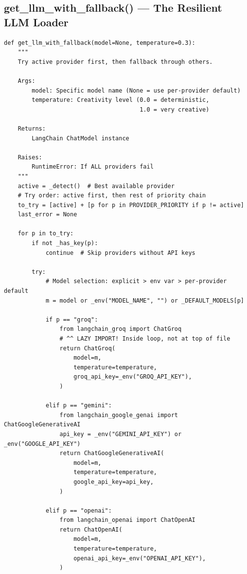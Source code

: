 \documentclass[11pt,a4paper,twoside]{report}
\begin{document}
\subsection{get\_llm\_with\_fallback() --- The Resilient LLM Loader}

\begin{lstlisting}[style=pythonstyle,caption={The most critical function in providers.py}]
def get_llm_with_fallback(model=None, temperature=0.3):
    """
    Try active provider first, then fallback through others.

    Args:
        model: Specific model name (None = use per-provider default)
        temperature: Creativity level (0.0 = deterministic,
                                       1.0 = very creative)

    Returns:
        LangChain ChatModel instance

    Raises:
        RuntimeError: If ALL providers fail
    """
    active = _detect()  # Best available provider
    # Try order: active first, then rest of priority chain
    to_try = [active] + [p for p in PROVIDER_PRIORITY if p != active]
    last_error = None

    for p in to_try:
        if not _has_key(p):
            continue  # Skip providers without API keys

        try:
            # Model selection: explicit > env var > per-provider default
            m = model or _env("MODEL_NAME", "") or _DEFAULT_MODELS[p]

            if p == "groq":
                from langchain_groq import ChatGroq
                # ^^ LAZY IMPORT! Inside loop, not at top of file
                return ChatGroq(
                    model=m,
                    temperature=temperature,
                    groq_api_key=_env("GROQ_API_KEY"),
                )

            elif p == "gemini":
                from langchain_google_genai import ChatGoogleGenerativeAI
                api_key = _env("GEMINI_API_KEY") or _env("GOOGLE_API_KEY")
                return ChatGoogleGenerativeAI(
                    model=m,
                    temperature=temperature,
                    google_api_key=api_key,
                )

            elif p == "openai":
                from langchain_openai import ChatOpenAI
                return ChatOpenAI(
                    model=m,
                    temperature=temperature,
                    openai_api_key=_env("OPENAI_API_KEY"),
                )


\end{lstlisting}
\end{document}
